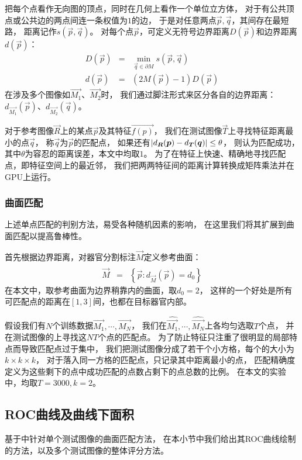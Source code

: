 把每个点看作无向图的顶点，同时在几何上看作一个单位立方体，
对于有公共顶点或公共边的两点间连一条权值为$1$的边，
于是对任意两点$\vec{p}, \vec{q}$，其间存在最短路，
距离记作$s(\vec{p}, \vec{q})$。
对每个点$\vec{p}$，可定义无符号边界距离$D(\vec{p})$和边界距离$d(\vec{p})$：
\begin{eqnarray}
    D(\vec{p}) &=& \min_{\vec{q} \in \partial M} s(\vec{p}, \vec{q}) \\
    d(\vec{p}) &=& (2M(\vec{p})-1)D(\vec{p})
\end{eqnarray}
在涉及多个图像如$\vec{M_1}$、$\vec{M_2}$时，
我们通过脚注形式来区分各自的边界距离：
$d_{\vec{M_1}}(\vec{p})$、$d_{\vec{M_2}}(\vec{q})$。

对于参考图像$\vec{R}$上的某点$\vec{p}$及其特征$\vec{f(p)}$，
我们在测试图像$\vec{T}$上寻找特征距离最小的点$\vec{q}$，
称$\vec{q}$为$\vec{p}$的匹配点，
如果还有$\left|d_{\boldsymbol{R}}(\boldsymbol{p}) - d_{\boldsymbol{T}}(\boldsymbol{q})\right| \le \theta$，
则认为匹配成功，其中$\theta$为容忍的距离误差，本文中均取$1$。
为了在特征上快速、精确地寻找匹配点，即特征空间上的最近邻，
我们把两两特征间的距离计算转换成矩阵乘法并在GPU上运行。

\subsubsection{曲面匹配\label{sec:expr:match}}
上述单点匹配的判别方法，易受各种随机因素的影响，
在这里我们将其扩展到曲面匹配以提高鲁棒性。

首先根据边界距离，对器官分割标注$\vec{M}$定义参考曲面：
\begin{eqnarray}
    \hat{\vec{M}} &=& \left\{ \vec{p} : d_{\vec{M}}(\vec{p}) = d_0 \right\}
\end{eqnarray}
在本文中，取参考曲面为边界稍靠内的曲面，取$d_0=2$，
这样的一个好处是所有可匹配点的距离在$[1, 3]$间，也都在目标器官内部。

假设我们有$N$个训练数据$\vec{M_1},\cdots,\vec{M_N}$，
我们在$\hat{\vec{M_1}},\cdots,\hat{\vec{M_N}}$上各均匀选取$T$个点，
并在测试图像的上寻找这$NT$个点的匹配点。
为了防止特征只注重了很明显的局部特点而导致匹配点过于集中，
我们把测试图像分成了若干个小方格，每个的大小为$k\times k \times k$，
对于落入同一方格的匹配点，只记录其中距离最小的点，
匹配精确度定义为这些剩下的点中成功匹配的点数占剩下的点总数的比例。
在本文的实验中，均取$T=3000, k=2$。


\subsection{ROC曲线及曲线下面积}
基于中针对单个测试图像的曲面匹配方法，
在本小节中我们给出其ROC曲线绘制的方法，以及多个测试图像的整体评分方法。

